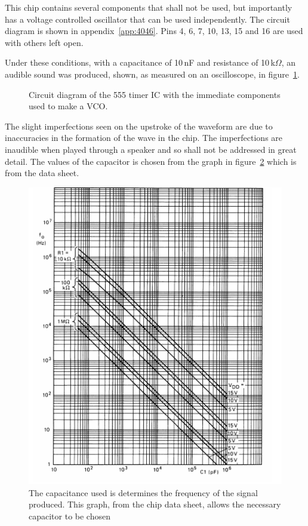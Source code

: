 This chip contains several components that shall not be used, but importantly has a voltage controlled oscillator that can be used independently. The circuit diagram is shown in appendix~\ref{app:4046}. Pins 4, 6, 7, 10, 13, 15 and 16 are used with others left open.

Under these conditions, with a capacitance of 10\,nF and resistance of 10\,k$\Omega$, an audible sound was produced, shown, as measured on an oscilloscope, in figure~\ref{fig:4046square}.

\begin{figure}[htbp]
	\centering
		
		\caption{Circuit diagram of the 555 timer IC with the immediate components used to make a VCO.}
		\label{fig:4046square}
\end{figure}

The slight imperfections seen on the upstroke of the waveform are due to inaccuracies in the formation of the wave in the chip. The imperfections are inaudible when played through a speaker and so shall not be addressed in great detail. The values of the capacitor is chosen from the graph in figure~\ref{fig:4046graph} which is from the data sheet.

\begin{figure}[htbp]
	\begin{center}
		\includegraphics[scale=0.4]{report_img/4046graph}
		\caption{The capacitance used is determines the frequency of the signal produced. This graph, from the chip data sheet, allows the necessary capacitor to be chosen}
		\label{fig:4046graph}
	\end{center}
\end{figure}

